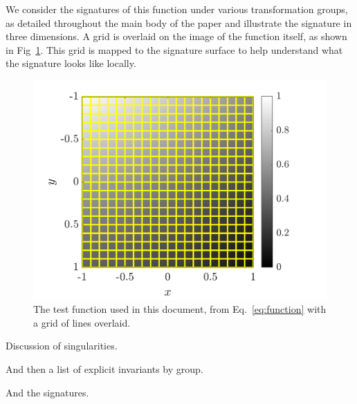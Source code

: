 \documentclass[review,onefignum,onetabnum]{siamonline190516}
\begin{document}
We consider the signatures of this function under various transformation
groups, as detailed throughout the main body of the paper and illustrate
the signature in three dimensions. A grid is overlaid on the image of the
function itself, as shown in Fig~\ref{fig:function_scanlines}. This grid is
mapped to the signature surface to help understand what the signature looks
like locally.
\begin{figure}
  \centering
  \includegraphics[width=12cm]{Figs/function_scanlines}
  \caption{The test function used in this document, from
  Eq.~\eqref{eq:function} with a grid of lines
overlaid.}\label{fig:function_scanlines}
\end{figure}













Discussion of singularities. 

And then a list of explicit invariants by group.

And the signatures.
\end{document}
